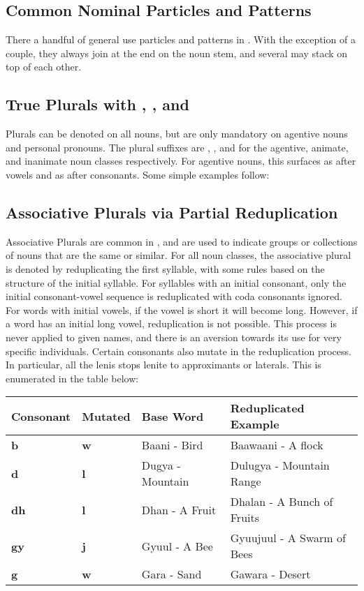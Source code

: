 \subsection{Common Nominal Particles and Patterns}
There a handful of general use particles and patterns in \langname. With the exception of a couple, they always join at the end on the noun stem, and several may stack on top of each other.

  \subsection{True Plurals with \suffixtext{\agtconsplural}, \suffixtext{\animplural}, and \suffixtext{\inanplural}}
  Plurals can be denoted on all nouns, but are only mandatory on agentive nouns and personal pronouns. The plural suffixes are \suffixtext{\agtplural}, \suffixtext{\animplural}, and \suffixtext{\inanplural} for the agentive, animate, and inanimate noun classes respectively. For agentive nouns, this surfaces as \suffixtext{\agtvowelplural} after vowels and as \suffixtext{\agtconsplural} after consonants. Some simple examples follow:


  \subsection{Associative Plurals via Partial Reduplication}
  Associative Plurals are common in \langname, and are used to indicate groups or collections of nouns that are the same or similar. For all noun classes, the associative plural is denoted by reduplicating the first syllable, with some rules based on the structure of the initial syllable. For syllables with an initial consonant, only the initial consonant-vowel sequence is reduplicated with coda consonants ignored. For words with initial vowels, if the vowel is short it will become long. However, if a word has an initial long vowel, reduplication is not possible. This process is never applied to given names, and there is an aversion towards its use for very specific individuals.
  Certain consonants also mutate in the reduplication process. In particular, all the lenis stops lenite to approximants or laterals. This is enumerated in the table below:

  \vertspace
  \begin{tabular}{|l|l|l|l|}
    \hline
    Consonant   & Mutated    & Base Word        & Reduplicated Example         \\ \hline \hline
    \textbf{b}  & \textbf{w} & Baani - Bird     & Baawaani - A flock           \\
    \textbf{d}  & \textbf{l} & Dugya - Mountain & Dulugya  - Mountain Range    \\
    \textbf{dh} & \textbf{l} & Dhan  - A Fruit  & Dhalan   - A Bunch of Fruits \\
    \textbf{gy} & \textbf{j} & Gyuul - A Bee    & Gyuujuul - A Swarm of Bees   \\
    \textbf{g}  & \textbf{w} & Gara  - Sand     & Gawara   - Desert            \\ \hline
  \end{tabular}
  
